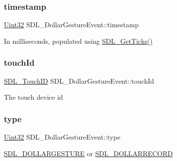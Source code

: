 \mbox{\label{struct_s_d_l___dollar_gesture_event_a3bccd8ebdf30b79c0f4074f6471ec583}} 
\subsubsection{\texorpdfstring{timestamp}{timestamp}}
{\footnotesize\ttfamily \mbox{\hyperlink{_s_d_l__stdinc_8h_add440eff171ea5f55cb00c4a9ab8672d}{Uint32}} S\+D\+L\+\_\+\+Dollar\+Gesture\+Event\+::timestamp}

In milliseconds, populated using \mbox{\hyperlink{_s_d_l__timer_8h_a0b9bc71d6287e0ffafdc3419760fe2b3}{S\+D\+L\+\_\+\+Get\+Ticks()}} \mbox{\label{struct_s_d_l___dollar_gesture_event_a40402f6911ed0dba48e6b23aa02bd83d}} 
\subsubsection{\texorpdfstring{touchId}{touchId}}
{\footnotesize\ttfamily \mbox{\hyperlink{_s_d_l__touch_8h_a10f5f86abe4ea8308a8706bd5d3b337a}{S\+D\+L\+\_\+\+Touch\+ID}} S\+D\+L\+\_\+\+Dollar\+Gesture\+Event\+::touch\+Id}

The touch device id \mbox{\label{struct_s_d_l___dollar_gesture_event_ac7f6948754a1b2eb36edde043bf75ce9}} 
\subsubsection{\texorpdfstring{type}{type}}
{\footnotesize\ttfamily \mbox{\hyperlink{_s_d_l__stdinc_8h_add440eff171ea5f55cb00c4a9ab8672d}{Uint32}} S\+D\+L\+\_\+\+Dollar\+Gesture\+Event\+::type}

\mbox{\hyperlink{_s_d_l__events_8h_a3b589e89be6b35c02e0dd34a55f3fccaaac5b40f77c7e1eba688d536d465989c6}{S\+D\+L\+\_\+\+D\+O\+L\+L\+A\+R\+G\+E\+S\+T\+U\+RE}} or \mbox{\hyperlink{_s_d_l__events_8h_a3b589e89be6b35c02e0dd34a55f3fccaa9ce9b2a0e8fd0e130d8ac8499704a277}{S\+D\+L\+\_\+\+D\+O\+L\+L\+A\+R\+R\+E\+C\+O\+RD}} \mbox{\label{struct_s_d_l___dollar_gesture_event_a9888449bd8842ed96494b4db16a6097b}} 
